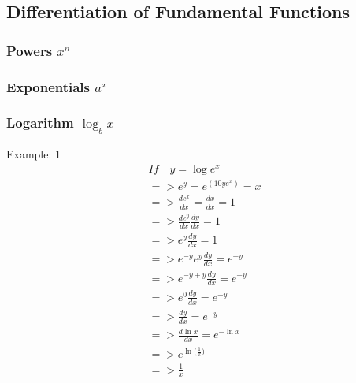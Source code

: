 	
	\subsection{Differentiation of Fundamental Functions}
	
		\subsubsection{Powers $x^n$}
		\subsubsection{Exponentials $a^x$}
		\subsubsection{Logarithm $\log_{b} x$}
		
			Example: 1
			\begin{align}
				If \quad y = \log e^x \\
				=> e^y=e^{(10ye^x)} = x \\
				=> \frac{de^x}{dx} = \frac{dx}{dx} = 1 \\
				=>\frac{de^y}{dx} \frac{dy}{dx} = 1 \\
				=>e^y \frac{dy}{dx} = 1 \\
				=>e^{-y}e^y\frac{dy}{dx} = e^{-y} \\
				=>e^{-y+y}\frac{dy}{dx} = e^{-y} \\
				=>e^0\frac{dy}{dx} = e^{-y} \\
				=>\frac{dy}{dx} = e^{-y} \\
				=> \frac{d\ln x}{dx} = e^{-\ln x} \\
				=> e^{\ln\big(\frac{1}{x}\big)} \\
				=> \frac{1}{x} \\
			\end{align}
		
